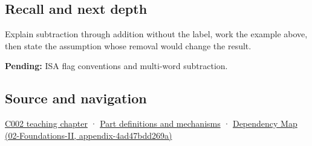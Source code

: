 \subsection{Recall and next depth}\label{appendix-1c7df340573e-recall-and-next-depth}

Explain subtraction through addition without the label, work the example above, then state the assumption whose removal would change the result.

\textbf{Pending:} ISA flag conventions and multi-word subtraction.

\subsection{Source and navigation}\label{appendix-1c7df340573e-source-and-navigation}

\hyperref[01-foundations-i-ch001-arithmetic-becomes-a-policy]{C002 teaching chapter} · \hyperref[appendix-fd090d982a15]{Part definitions and mechanisms} · \href{../02-Foundations-II/main.pdf\#nameddest=appendix-4ad47bdd269a}{Dependency Map (02-Foundations-II, appendix-4ad47bdd269a)}
